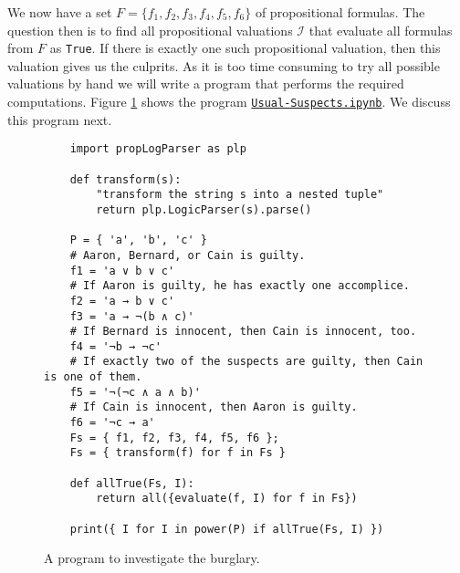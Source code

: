 We now have a set $F = \{ f_1, f_2, f_3, f_4, f_5, f_6 \}$ of propositional formulas.
The question then is to find all propositional valuations $\mathcal{I}$ that evaluate all formulas from $F$ as
\texttt{True}.  If there is exactly one such propositional valuation, then this valuation gives us the culprits.
As it is too time consuming to try all possible valuations by hand we will write a program that performs the
required computations.
Figure \ref{fig:Usual-Suspects.ipynb} shows the program
\href{https://github.com/karlstroetmann/Logic/blob/master/Python/Chapter-4/Usual-Suspects.ipynb}{\texttt{Usual-Suspects.ipynb}}.
We discuss this program next.

\begin{figure}[!ht]
  \centering
\begin{verbatim}
    import propLogParser as plp

    def transform(s):
        "transform the string s into a nested tuple"
        return plp.LogicParser(s).parse()
    
    P = { 'a', 'b', 'c' }
    # Aaron, Bernard, or Cain is guilty.
    f1 = 'a ∨ b ∨ c'
    # If Aaron is guilty, he has exactly one accomplice.
    f2 = 'a → b ∨ c'
    f3 = 'a → ¬(b ∧ c)'
    # If Bernard is innocent, then Cain is innocent, too.
    f4 = '¬b → ¬c'
    # If exactly two of the suspects are guilty, then Cain is one of them.
    f5 = '¬(¬c ∧ a ∧ b)'
    # If Cain is innocent, then Aaron is guilty.
    f6 = '¬c → a'
    Fs = { f1, f2, f3, f4, f5, f6 };
    Fs = { transform(f) for f in Fs }

    def allTrue(Fs, I):
        return all({evaluate(f, I) for f in Fs})

    print({ I for I in power(P) if allTrue(Fs, I) })
\end{verbatim}
\vspace*{-0.3cm}
  \caption{A program to investigate the burglary.}
  \label{fig:Usual-Suspects.ipynb}
\end{figure}

